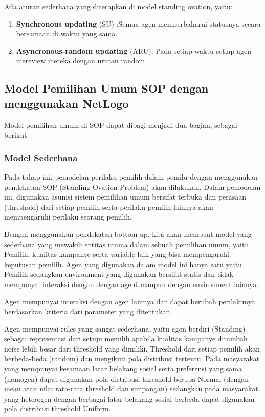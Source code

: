 Ada aturan sederhana yang diterapkan di model standing ovation, yaitu:
\begin{enumerate}
	\item \textbf{Synchronous updating} (SU) :Semua agen memperbaharui statusnya secara bersamaan di waktu yang sama.

	\item \textbf{Asyncronous-random updating} (ARU): Pada setiap waktu setiap agen mereview mereka dengan urutan random
\end{enumerate}

\subsection{Model Pemilihan Umum SOP dengan menggunakan NetLogo}

Model pemilihan umum di SOP dapat dibagi menjadi dua bagian, sebagai berikut:

\subsubsection{Model Sederhana}

Pada tahap ini, pemodelan perilaku pemilih dalam pemilu dengan menggunakan pendekatan SOP (Standing Ovation Problem) akan dilakukan. Dalam pemodelan ini, digunakan asumsi sistem pemilihan umum bersifat terbuka dan perasaan (threshold) dari setiap pemilih serta perilaku pemilih lainnya akan mempengaruhi perilaku seorang pemilih.

Dengan menggunakan pendekatan bottom-up, kita akan membuat model yang sederhana yang mewakili entitas utama dalam sebuah pemilihan umum, yaitu Pemilih, kualitas kampanye serta variable lain yang bisa mempengaruhi keputusan pemilih. Agen yang digunakan dalam model ini hanya satu yaitu Pemilih sedangkan environment yang digunakan bersifat statis dan tidak mempunyai interaksi dengan dengan agent maupun dengan environment lainnya.

Agen mempunyai interaksi dengan agen lainnya dan dapat berubah perilakunya berdasarkan kriteria dari parameter yang ditentukan.

Agen mempunyai rules yang sangat sederhana, yaitu agen berdiri (Standing) sebagai representasi dari setuju memilih apabila kualitas kampanye ditambah noise lebih besar dari threshold yang dimiliki. Threshold dari setiap pemilih akan berbeda-beda (random) dan mengikuti pola distribusi tertentu. Pada masyarakat yang mempunyai kesamaan latar belakang sosial serta preferensi yang sama (homogen) dapat digunakan pola distribusi threshold berupa Normal (dengan mean atau nilai rata-rata threshold dan simpangan) sedangkan pada masyarakat yang heterogen dengan berbagai latar belakang sosial berbeda dapat digunakan pola distribusi threshold Uniform.

